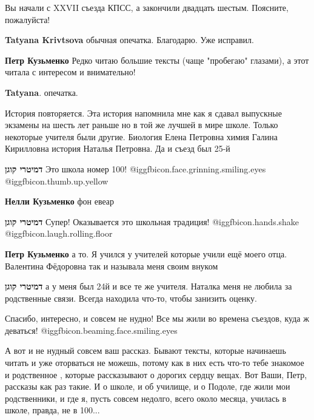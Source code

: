 \begin{itemize}

Вы начали с XXVII съезда КПСС, а закончили двадцать шестым. Поясните,
пожалуйста!

\begin{itemize} %
\textbf{Tatyana Krivtsova} обычная опечатка. Благодарю. Уже исправил.

\textbf{Петр Кузьменко} Редко читаю большие тексты (чаще "пробегаю" глазами), а этот читала с интересом и внимательно!

\textbf{Tatyana}. опечатка.
\end{itemize} %


История повторяется. Эта история напомнила мне как я сдавал выпускные экзамены
на шесть лет раньше но в той же лучшей в мире школе. Только некоторые учителя
были другие. Биология Елена Петровна химия Галина Кирилловна история Наталья
Петровна. Да и съезд был 25-й

\begin{itemize} %
\textbf{דמיטרי קוגן}
Это школа номер 100! @igg{fbicon.face.grinning.smiling.eyes}  @igg{fbicon.thumb.up.yellow} 

\textbf{Нелли Кузьменко} фон евеар

\textbf{דמיטרי קוגן} Супер! Оказывается это школьная традиция! @igg{fbicon.hands.shake}  @igg{fbicon.laugh.rolling.floor} 

\textbf{Петр Кузьменко} а то. Я учился у учителей которые учили ещё моего отца. Валентина Фёдоровна так и называла меня своим внуком

\textbf{דמיטרי קוגן} а у меня был 24й и все те же учителя. Наталка меня не любила за родственные связи. Всегда находила что-то, чтобы занизить оценку.
\end{itemize} %

Спасибо, интересно, и совсем не нудно! Все мы жили во времена съездов, куда ж деваться! @igg{fbicon.beaming.face.smiling.eyes} 


А вот и не нудный совсем ваш рассказ. Бывают тексты, которые начинаешь читать и
уже оторваться не можешь, потому как в них есть что-то тебе знакомое и
родственное , которые рассказывают о дорогих сердцу вещах. Вот Ваши, Петр,
рассказы как раз такие. И о школе, и об училище, и о Подоле, где жили мои
родственники, и где я, пусть совсем недолго, всего около месяца, училась в
школе, правда, не в 100...


\end{itemize}

